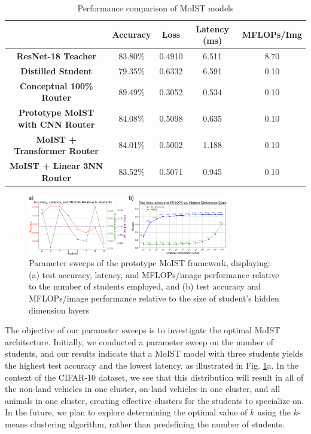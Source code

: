 \documentclass[conference]{IEEEtran}
\begin{document}
\begin{table}[!t]
\renewcommand{\arraystretch}{1.1}
\centering
\caption{Performance comparison of MoIST models}
\label{table:performance_comparison} 
\begin{adjustbox}{width=0.425\textwidth}
\small
\begin{tabular}{|c|c|c|c|c|}
\hline
 & \textbf{Accuracy} & \textbf{Loss} & \textbf{Latency (ms)} & \textbf{MFLOPs/Img} \\ \hline
\textbf{ResNet-18 Teacher} & 83.80\% & 0.4910 & 6.511 & 8.70 \\ \hline
\textbf{Distilled Student} & 79.35\% & 0.6332 & 6.591 & 0.10 \\ \hline
\textbf{Conceptual 100\% Router} & 89.49\% & 0.3052 & 0.534 & 0.10 \\ \hline
\textbf{Prototype MoIST with CNN Router} & 84.08\% & 0.5098 & 0.635 & 0.10 \\ \hline
\textbf{MoIST + Transformer Router} & 84.01\% &  0.5002 & 1.188 & 0.10 \\ \hline
\textbf{MoIST + Linear 3NN Router} & 83.52\% & 0.5071 & 0.945 & 0.10 \\ \hline
\end{tabular}
\end{adjustbox}
\end{table}

\begin{figure}[ht!] %
\centering
\includegraphics[width=3.45in]{figures/param_sweeps.png}
\caption{Parameter sweeps of the prototype MoIST framework, displaying: (a) test accuracy, latency, and MFLOPs/image performance relative to the number of students employed, and (b) test accuracy and MFLOPs/image performance relative to the size of student's hidden dimension layers}
\label{param_sweep}
\end{figure}

The objective of our parameter sweeps is to investigate the optimal MoIST architecture. Initially, we conducted a parameter sweep on the number of students, and our results indicate that a MoIST model with three students yields the highest test accuracy and the lowest latency, as illustrated in Fig. \ref{param_sweep}a. In the context of the CIFAR-10 dataset, we see that this distribution will result in all of the non-land vehicles in one cluster, on-land vehicles in one cluster, and all animals in one cluster, creating effective clusters for the students to specialize on. In the future, we plan to explore determining the optimal value of $k$ using the $k$-means clustering algorithm, rather than predefining the number of students.
\end{document}

